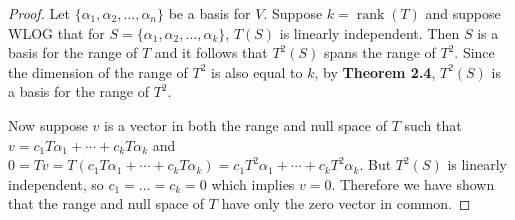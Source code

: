 \documentclass{article}
\DeclareMathOperator{\rank}{rank}
\begin{document}
\begin{proof}
  Let $\{\alpha_1, \alpha_2, \ldots, \alpha_n\}$ be a basis for $V$. Suppose
  $k = \rank(T)$ and suppose WLOG that for $S = \{\alpha_1, \alpha_2, \ldots,
  \alpha_k\}$, $T(S)$ is linearly independent. Then $S$ is a basis for the range
  of $T$ and it follows that $T^2(S)$ spans the range of $T^2$. Since the
  dimension of the range of $T^2$ is also equal to $k$, by \textbf{Theorem 2.4},
  $T^2(S)$ is a basis for the range of $T^2$.

  Now suppose $v$ is a vector in both the range and null space of $T$ such that
  $v = c_1T\alpha_1 + \cdots + c_kT\alpha_k$ and $0 = Tv = T(c_1T\alpha_1 +
  \cdots + c_kT\alpha_k) = c_1T^2\alpha_1 + \cdots + c_kT^2\alpha_k$. But
  $T^2(S)$ is linearly independent, so $c_1 = \ldots = c_k = 0$ which implies
  $v = 0$. Therefore we have shown that the range and null space of $T$ have
  only the zero vector in common.
\end{proof}
\end{document}
